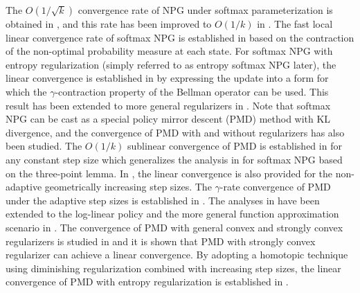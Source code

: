 The $O(1/\sqrt{k})$ convergence rate of NPG under softmax parameterization is obtained in \cite{shani2020trpo}, and this rate has been improved to $O(1/k)$ in \cite{Agarwal_Kakade_Lee_Mahajan_2019}. The fast local linear convergence rate of softmax NPG is established in \cite{Khodadadian_Jhunjhunwala_Varma_Maguluri_2021} based on the contraction of the non-optimal probability measure at each state. For softmax NPG with entropy regularization (simply referred to as entropy softmax NPG later), the linear convergence is established in \cite{Cen_Cheng_Chen_Wei_Chi_2022} by expressing the update into a form for which the $\gamma$-contraction property of the Bellman operator can be used. This result has been extended to more general regularizers in \cite{Zhan_Cen_Huang_Chen_Lee_Chi_2021}. Note that softmax NPG can be cast as a special policy mirror descent (PMD) method with KL divergence, and the convergence of PMD with and without regularizers has also been studied. The $O(1/k)$ sublinear convergence of PMD is established in \cite{Xiao_2022} for any constant step size which generalizes the analysis in \cite{Agarwal_Kakade_Lee_Mahajan_2019} for softmax NPG based on the three-point lemma.  
In \cite{Xiao_2022}, the linear convergence is also provided for the non-adaptive geometrically increasing step sizes. The $\gamma$-rate convergence of PMD under the adaptive step sizes is established in \cite{Johnson_Pike-Burke_Rebeschini_2023}. The analyses in \cite{Xiao_2022} have been extended to the log-linear policy and the more general function approximation scenario in \cite{Yuan_Du_Gower_Lazaric_Xiao_2022, yuan2023general}.
The convergence of PMD with general convex and strongly convex regularizers is studied in \cite{Lan_2021} and it is shown that PMD with strongly convex regularizer can achieve a linear convergence. By adopting a homotopic technique using diminishing regularization combined with increasing step sizes, the linear convergence of PMD with entropy regularization is established in \cite{Li_Zhao_Lan_2022}.
